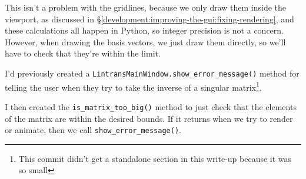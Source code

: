 \documentclass[../main.tex]{subfiles}
\begin{document}
This isn't a problem with the gridlines, because we only draw them inside the viewport, as discussed in \S\ref{development:improving-the-gui:fixing-rendering}, and these calculations all happen in Python, so integer precision is not a concern. However, when drawing the basis vectors, we just draw them directly, so we'll have to check that they're within the limit.

I'd previously created a \texttt{LintransMainWindow.show\_error\_message()} method for telling the user when they try to take the inverse of a singular matrix\footnote{This commit didn't get a standalone section in this write-up because it was so small}.


I then created the \texttt{is\_matrix\_too\_big()} method to just check that the elements of the matrix are within the desired bounds. If it returns  when we try to render or animate, then we call \texttt{show\_error\_message()}.

\end{document}
